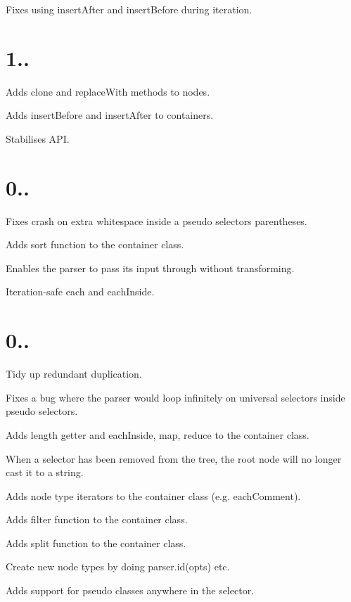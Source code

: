 \begin{DoxyItemize}
\item Fixes using {\ttfamily insert\+After} and {\ttfamily insert\+Before} during iteration.
\end{DoxyItemize}

\section*{1..}


\begin{DoxyItemize}
\item Adds {\ttfamily clone} and {\ttfamily replace\+With} methods to nodes.
\item Adds {\ttfamily insert\+Before} and {\ttfamily insert\+After} to containers.
\item Stabilises A\+PI.
\end{DoxyItemize}

\section*{0..}


\begin{DoxyItemize}
\item Fixes crash on extra whitespace inside a pseudo selector\textquotesingle{}s parentheses.
\item Adds sort function to the container class.
\item Enables the parser to pass its input through without transforming.
\item Iteration-\/safe {\ttfamily each} and {\ttfamily each\+Inside}.
\end{DoxyItemize}

\section*{0..}


\begin{DoxyItemize}
\item Tidy up redundant duplication.
\item Fixes a bug where the parser would loop infinitely on universal selectors inside pseudo selectors.
\item Adds {\ttfamily length} getter and {\ttfamily each\+Inside}, {\ttfamily map}, {\ttfamily reduce} to the container class.
\item When a selector has been removed from the tree, the root node will no longer cast it to a string.
\item Adds node type iterators to the container class (e.\+g. {\ttfamily each\+Comment}).
\item Adds filter function to the container class.
\item Adds split function to the container class.
\item Create new node types by doing {\ttfamily parser.\+id(opts)} etc.
\item Adds support for pseudo classes anywhere in the selector.
\end{DoxyItemize}

